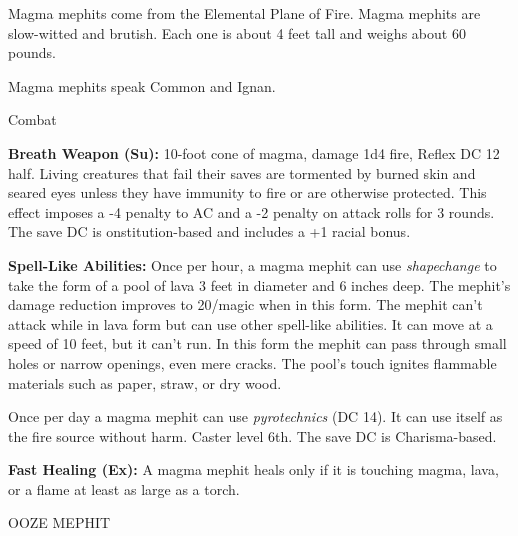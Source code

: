 \documentclass{article}
\begin{document}
Magma mephits come from the Elemental Plane of Fire. Magma mephits are slow-witted 
and brutish. Each one is about 4 feet tall and weighs about 60 pounds.

Magma mephits speak Common and Ignan.

Combat

\textbf{Breath Weapon (Su): }10-foot cone of magma, damage 1d4 fire, Reflex DC 
12 half. Living creatures that fail their saves are tormented by burned skin and 
seared eyes unless they have immunity to fire or are otherwise protected. This 
effect imposes a -4 penalty to AC and a -2 penalty on attack rolls for 3 rounds. 
The save DC is  onstitution-based and includes a +1 racial bonus.

\textbf{Spell-Like Abilities:} Once per hour, a magma mephit can use \textit{shapechange 
}to take the form of a pool of lava 3 feet in diameter and 6 inches deep. The mephit's 
damage reduction improves to 20/magic when in this form. The mephit can't attack 
while in lava form but can use other spell-like abilities. It can move at a speed 
of 10 feet, but it can't run. In this form the mephit can pass through small holes 
or narrow openings, even mere cracks. The pool's touch ignites flammable materials 
such as paper, straw, or dry wood.

Once per day a magma mephit can use \textit{pyrotechnics }(DC 14). It can use itself 
as the fire source without harm. Caster level 6th. The save DC is Charisma-based.

\textbf{Fast Healing (Ex):} A magma mephit heals only if it is touching magma, 
lava, or a flame at least as large as a torch.

\vspace{12pt}
OOZE MEPHIT
\end{document}
